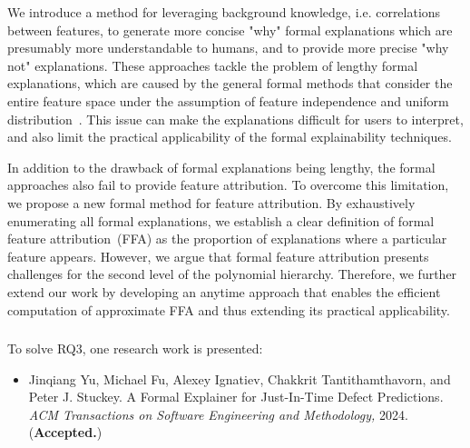 We introduce a method for leveraging background knowledge,
i.e.  correlations between features, to generate more concise "why" formal explanations
which are presumably more understandable to humans,
and to provide more precise "why not" explanations.
%
These approaches tackle the problem of lengthy formal explanations, 
which are caused by the general formal methods that consider the entire 
feature space under the assumption of feature independence and
uniform distribution~\cite{kutyniok-jair21}.
%
This issue can make the explanations difficult for users to interpret, 
and also limit the practical applicability of the formal explainability
techniques.

In addition to the drawback of formal explanations being lengthy,
the  formal approaches also fail to provide feature attribution.
%
To overcome this limitation, we propose a new formal method for feature attribution.
%
By exhaustively enumerating all formal explanations, we establish a clear definition
of formal feature attribution~(FFA) as the proportion of explanations
where a particular feature appears.
%
However, we argue that formal feature attribution presents challenges for
the second level of the polynomial hierarchy.
%
Therefore, we further extend our work by developing an anytime approach 
that enables the efficient computation of approximate FFA 
and thus extending its practical applicability.

\subsubsection{}

To solve RQ3,  one research work is presented:
\begin{itemize}
	\item Jinqiang Yu, Michael Fu, Alexey Ignatiev, Chakkrit Tantithamthavorn, and Peter J. Stuckey. A
Formal Explainer for Just-In-Time Defect Predictions. \emph{ACM Transactions on Software Engineering
	and Methodology,} 2024. (\textbf{Accepted.}) 
\end{itemize}



